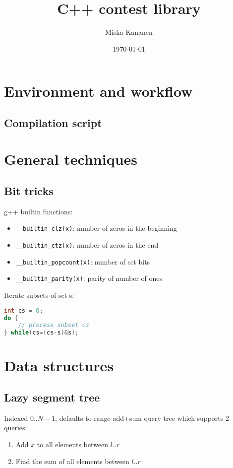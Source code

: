 \documentclass{article}
\begin{document}
\title{C++ contest library}
\author{Miska Kananen}
\date{\today}
\maketitle 

\tableofcontents

\section{Environment and workflow}
\subsection{Compilation script}


\section{General techniques}
\subsection{Bit tricks}

g++ builtin functions:
\begin{itemize}
	\item \verb|__builtin_clz(x)|: number of zeros in the beginning
	\item \verb|__builtin_ctz(x)|: number of zeros in the end
	\item \verb|__builtin_popcount(x)|: number of set bits
	\item \verb|__builtin_parity(x)|: parity of number of ones
\end{itemize}

Iterate subsets of set s:
\begin{lstlisting}[language=C++]
int cs = 0;
do {
	// process subset cs
} while(cs=(cs-s)&s);
\end{lstlisting}

\section{Data structures}

\subsection{Lazy segment tree}

Indexed $0$..$N-1$, defaults to range add+sum query tree which supports 2 queries:
\begin{enumerate}
	\item Add $x$ to all elements between $l$..$r$
	\item Find the sum of all elements between $l$..$r$
\end{enumerate}
\end{document}
